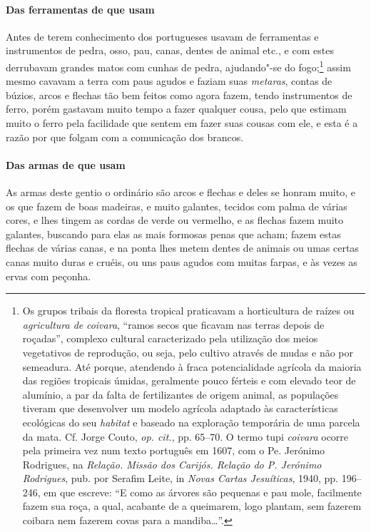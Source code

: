 \begin{linenumbers}
\paragraph{Das ferramentas de que usam} \quad
 Antes de terem conhecimento dos portugueses usavam de ferramentas e
instrumentos de pedra, osso, pau, canas, dentes de animal etc., e com
estes derrubavam grandes matos com cunhas de pedra, ajudando"-se do
fogo;\footnote{ Os grupos tribais da floresta tropical praticavam a
horticultura de raízes ou \textit{agricultura de} \textit{coivara}, 
``ramos secos que ficavam nas terras depois de roçadas'', complexo
cultural caracterizado pela utilização dos meios vegetativos de
reprodução, ou seja, pelo cultivo através de mudas e não por semeadura.
Até porque, atendendo à fraca potencialidade agrícola da maioria das
regiões tropicais úmidas, geralmente pouco férteis e com elevado teor
de alumínio, a par da falta de fertilizantes de origem animal, as
populações tiveram que desenvolver um modelo agrícola adaptado às
características ecológicas do seu \textit{habitat} e baseado na
exploração temporária de uma parcela da mata. Cf. Jorge Couto, 
\textit{op. cit.}, pp. 65--70. O termo tupi \textit{coivara} ocorre pela
primeira vez num texto português em 1607, com o Pe. Jerónimo
Rodrigues, na \textit{Relação. Missão dos Carijós. Relação do P.
Jerónimo Rodrigues}, pub. por Serafim Leite, in \textit{Novas Cartas
Jesuíticas}, 1940, pp. 196--246, em que escreve: ``E como as
árvores são pequenas e pau mole, facilmente fazem sua roça, a qual,
acabante de a queimarem, logo plantam, sem fazerem coibara nem fazerem
covas para a mandiba\ldots{}''.} assim mesmo cavavam a terra com paus agudos
e faziam suas \textit{metaras}, contas de búzios, arcos e flechas tão
bem feitos como agora fazem, tendo instrumentos de ferro, porém
gastavam muito tempo a fazer qualquer cousa, pelo que estimam muito o
ferro pela facilidade que sentem em fazer suas cousas com ele, e esta é
a razão por que folgam com a comunicação dos brancos.

\paragraph{Das armas de que usam} \quad
As armas deste gentio o ordinário são arcos e flechas e deles
se honram muito, e os que fazem de boas madeiras, e muito galantes,
tecidos com palma de várias cores, e lhes tingem as cordas de verde ou
vermelho, e as flechas fazem muito galantes, buscando para elas as mais
formosas penas que acham; fazem estas flechas de várias canas, e na
ponta lhes metem dentes de animais ou umas certas canas muito duras e
cruéis, ou uns paus agudos com muitas farpas, e às vezes as ervas com peçonha. 


\end{linenumbers}
